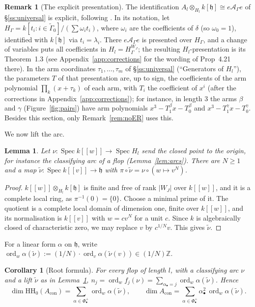 \documentclass[11pt]{amsart}
\numberwithin{table}{section}
\numberwithin{figure}{section}
\numberwithin{equation}{section}
\newtheorem{lem}[thm]{Lemma}
\newtheorem{cor}[thm]{Corollary}
\theoremstyle{definition}
\newtheorem{rem}[thm]{Remark}
\theoremstyle{plain}
\newcommand{\Acon}{A_{\mathrm{con}}}
\newcommand{\cA}{\mathcal{A}}
\newcommand{\h}{\mathfrak{h}}
\newcommand{\bul}{\bullet}
\newcommand{\tGamma}{\widetilde{\Gamma}}
\newcommand{\HH}{\mathrm{HH}}
\newcommand{\Z}{\mathbb{Z}}
\DeclareMathOperator{\Spec}{Spec}
\DeclareMathOperator{\ord}{ord}
\newcommand{\tnu}{\tilde\nu}
\begin{document}
\begin{rem}[The explicit presentation]\label{rem:Kpresentation}
The identification $A_l \otimes_{H_l} k[\h] \cong e\cA_\Gamma e$ of \S\ref{ss:universal} is explicit, following \cite[\S\S2.2, 4.5, Examples~4.24--4.27]{K}. In its notation, let $H_\Gamma = k[t_i : i \in \tGamma_0]/(\sum \omega_i t_i)$, where $\omega_i$ are the coefficients of $\delta$ (so $\omega_0 = 1$), identified with $k[\h]$ via $t_i = \lambda_i$. There $e\cA_\Gamma e$ is presented over $H_\Gamma$, and a change of variables puts all coefficients in $H_l = H_\Gamma^{W_J}$; the resulting $H_l$-presentation is its Theorem~1.3 (see Appendix~\ref{app:corrections} for the wording of Prop~4.21 there). In the arm coordinates $\tau_1, \dots, \tau_m$ of \S\ref{ss:universal} (``Generators of $H_l$''), the parameters $T$ of that presentation are, up to sign, the coefficients of the arm polynomial $\prod_k (x + \tau_k)$ of each arm, with $T_i$ the coefficient of $x^i$ (after the corrections in Appendix~\ref{app:corrections}); for instance, in length $3$ the arms $\beta$ and $\gamma$ (Figure~\ref{fig:pairs}) have arm polynomials $x^3 - T_1^\beta x - T_0^\beta$ and $x^3 - T_1^\gamma x - T_0^\gamma$. Besides this section, only Remark~\ref{rem:noER} uses this.
\end{rem}

We now lift the arc.

\begin{lem}\label{lem:lift}
Let $\nu\colon \Spec k[[w]] \to \Spec H_l$ send the closed point to the origin, for instance the classifying arc of a flop (Lemma~\ref{lem:arcs}). There are $N \ge 1$ and a map $\tnu\colon \Spec k[[v]] \to \h$ with $\pi \circ \tnu = \nu \circ (w \mapsto v^N)$.
\end{lem}

\begin{proof}
$k[[w]] \otimes_{H_l} k[\h]$ is finite and free of rank $|W_J|$ over $k[[w]]$, and it is a complete local ring, as $\pi^{-1}(0) = \{0\}$. Choose a minimal prime of it. The quotient is a complete local domain of dimension one, finite over $k[[w]]$, and its normalisation is $k[[v]]$ with $w = c v^N$ for a unit $c$. Since $k$ is algebraically closed of characteristic zero, we may replace $v$ by $c^{1/N}v$. This gives $\tnu$.
\end{proof}

For a linear form $\alpha$ on $\h$, write $\ord_w \alpha(\tnu) := (1/N)\cdot\ord_v \alpha(\tnu(v)) \in (1/N)\Z$.

\begin{cor}[Root formula]\label{prop:rootformula}
For every flop of length $l$, with a classifying arc $\nu$ and a lift $\tnu$ as in Lemma~\ref{lem:lift}, $n_j = \ord_w f_j(\nu) = \sum_{\alpha_\bul = j} \ord_w \alpha(\tnu)$. Hence
\[
\dim \HH_0(\Acon) = \sum_{\alpha \in \Phi^+_\bul} \ord_w \alpha(\tnu), \qquad \dim \Acon = \sum_{\alpha \in \Phi^+_\bul} \alpha_\bul^2 \, \ord_w \alpha(\tnu).
\]
\end{cor}
\end{document}
